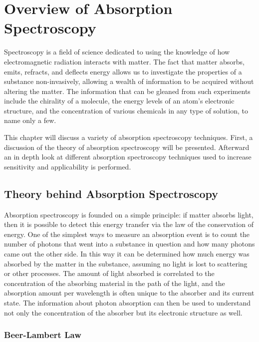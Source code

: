 \chapter{Overview of Absorption Spectroscopy}\label{ch:overview}

Spectroscopy is a field of science dedicated to using the knowledge of how
electromagnetic radiation interacts with matter. The fact that matter absorbs,
emits, refracts, and deflects energy allows us to investigate the properties
of a substance non-invasively, allowing a wealth of information to be acquired
without altering the matter. The information that can be gleaned from such
experiments include the chirality of a molecule, the energy levels of an
atom's electronic structure, and the concentration of various chemicals in any
type of solution, to name only a few.

This chapter will discuss a variety of absorption spectroscopy techniques.
First, a discussion of the theory of absorption spectroscopy will be
presented. Afterward an in depth look at different absorption spectroscopy
techniques used to increase sensitivity and applicability is performed.



\section{Theory behind Absorption Spectroscopy}\label{sec:abs_theory}

Absorption spectroscopy is founded on a simple principle: if matter absorbs
light, then it is possible to detect this energy transfer via the law of the
conservation of energy. One of the simplest ways to measure an absorption
event is to count the number of photons that went into a substance in question
and how many photons came out the other side. In this way it can be determined
how much energy was absorbed by the matter in the substance, assuming no
light is lost to scattering or other processes. The amount of light absorbed
is correlated to the concentration of the absorbing material in the path of
the light, and the absorption amount per wavelength is often unique to the
absorber and its current state. The information about photon absorption can
then be used to understand not only the concentration of the absorber but its
electronic structure as well.



\subsection{Beer-Lambert Law}\label{subsec:beer}

